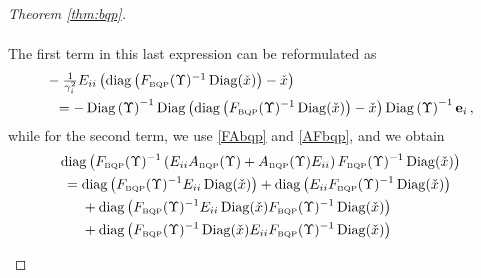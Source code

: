\documentclass[smallextended]{svjour3hack}       %
\DeclareMathOperator{\Diag}{Diag}
\DeclareMathOperator{\diag}{diag}
\begin{document}
\begin{proof}[Theorem \ref{thm:bqp}]
\begin{itemize}
\begin{align*}
\end{align*}
The first term in this last expression can be reformulated as
 \begin{align*}
    &-\textstyle\frac{1}{\gamma_i^2}E_{ii}\left(\diag\left(F_{{\tiny\mbox{BQP}}}(\Upsilon)^{-1}\Diag(\check{x})\right)-\check{x}\right)\\
     &~~= -  \Diag\left(\Upsilon\right)^{-1} \Diag\left(\diag\left(F_{{\tiny\mbox{BQP}}}(\Upsilon)^{-1}\Diag(\check{x})\right)-\check{x}\right)
     \Diag\left(\Upsilon\right)^{-1} \mathbf{e}_i\,,
 \end{align*}
 while for the second term, we use \eqref{FAbqp} and \eqref{AFbqp}, and we obtain
 \begin{align*}
     &\diag\left(F_{{\tiny\mbox{BQP}}}(\Upsilon)^{-1}\left(E_{ii}A_{{\tiny\mbox{BQP}}}(\Upsilon)+A_{{\tiny\mbox{BQP}}}(\Upsilon) E_{ii}\right) F_{{\tiny\mbox{BQP}}}(\Upsilon)^{-1}\Diag(\check{x})\right)\\
     &~= \diag\left(F_{{\tiny\mbox{BQP}}}(\Upsilon)^{-1}E_{ii}\Diag(\check{x})\right)+ \diag\left( E_{ii}F_{{\tiny\mbox{BQP}}}(\Upsilon)^{-1}\Diag(\check{x})\right)\\
     &~~ \quad +\diag\left(F_{{\tiny\mbox{BQP}}}(\Upsilon)^{-1}E_{ii} \Diag(\check{x}) F_{{\tiny\mbox{BQP}}}(\Upsilon)^{-1}\Diag(\check{x})\right)\\
     &~~ \quad +\diag\left( F_{{\tiny\mbox{BQP}}}(\Upsilon)^{-1}\Diag(\check{x})E_{ii} F_{{\tiny\mbox{BQP}}}(\Upsilon)^{-1}\Diag(\check{x})\right)\\

\end{align*}
\end{itemize}
\end{proof}
\end{document}
